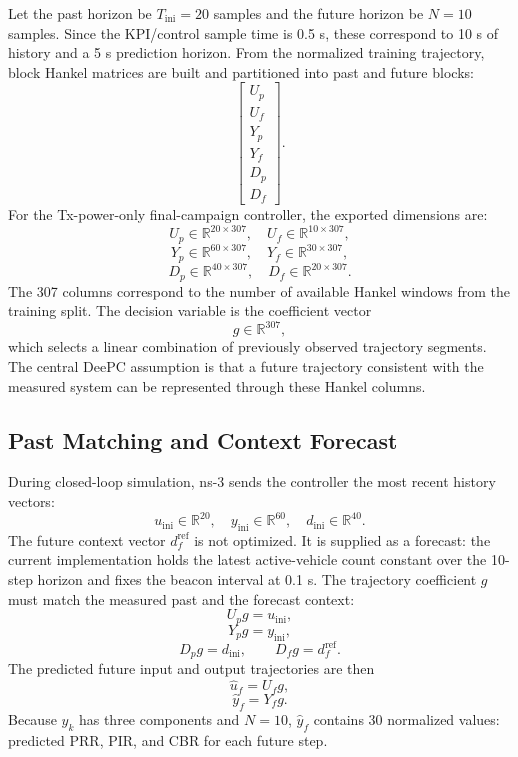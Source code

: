 \documentclass[11pt]{article}
\begin{document}
Let the past horizon be $T_{\mathrm{ini}} = 20$ samples and the future horizon
be $N = 10$ samples. Since the KPI/control sample time is 0.5 s, these
correspond to 10 s of history and a 5 s prediction horizon. From the normalized
training trajectory, block Hankel matrices are built and partitioned into past
and future blocks:
\[
\begin{bmatrix}
U_p \\
U_f \\
Y_p \\
Y_f \\
D_p \\
D_f
\end{bmatrix}.
\]
For the Tx-power-only final-campaign controller, the exported dimensions are:
\[
U_p \in \mathbb{R}^{20 \times 307}, \quad
U_f \in \mathbb{R}^{10 \times 307},
\]
\[
Y_p \in \mathbb{R}^{60 \times 307}, \quad
Y_f \in \mathbb{R}^{30 \times 307},
\]
\[
D_p \in \mathbb{R}^{40 \times 307}, \quad
D_f \in \mathbb{R}^{20 \times 307}.
\]
The 307 columns correspond to the number of available Hankel windows from the
training split. The decision variable is the coefficient vector
\[
g \in \mathbb{R}^{307},
\]
which selects a linear combination of previously observed trajectory segments.
The central DeePC assumption is that a future trajectory consistent with the
measured system can be represented through these Hankel columns.

\subsection{Past Matching and Context Forecast}

During closed-loop simulation, ns-3 sends the controller the most recent
history vectors:
\[
u_{\mathrm{ini}} \in \mathbb{R}^{20}, \quad
y_{\mathrm{ini}} \in \mathbb{R}^{60}, \quad
d_{\mathrm{ini}} \in \mathbb{R}^{40}.
\]
The future context vector $d_f^{\mathrm{ref}}$ is not optimized. It is supplied
as a forecast: the current implementation holds the latest active-vehicle count
constant over the 10-step horizon and fixes the beacon interval at 0.1 s. The
trajectory coefficient $g$ must match the measured past and the forecast
context:
\[
U_p g = u_{\mathrm{ini}},
\]
\[
Y_p g = y_{\mathrm{ini}},
\]
\[
D_p g = d_{\mathrm{ini}}, \qquad D_f g = d_f^{\mathrm{ref}}.
\]
The predicted future input and output trajectories are then
\[
\hat{u}_f = U_f g,
\]
\[
\hat{y}_f = Y_f g.
\]
Because $y_k$ has three components and $N=10$, $\hat{y}_f$ contains 30
normalized values: predicted PRR, PIR, and CBR for each future step.
\end{document}
